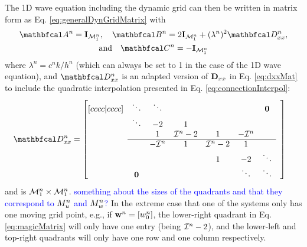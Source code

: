 \documentclass[fleqn]{jaes}
\def\SWcomment[#1]{\textcolor{blue}{#1}}
\begin{document}
The 1D wave equation including the dynamic grid can then be written in matrix form as Eq. \eqref{eq:generalDynGridMatrix} with
\begin{equation}\label{eq:1DwaveDynMatrix}
\begin{gathered}
    \AA = \I_{\MoneD}, \quad \BB = 2\I_\MoneD + (\lambda^n)^2\DDxx,\\
\text{and} \quad\CC = -\I_{\MoneD}
\end{gathered}
\end{equation}
where $\lambda^n = c^nk/h^n$ (which can always be set to 1 in the case of the 1D wave equation), and $\DDxx$ is an adapted version of $\mathbf{D}_{xx}$ in Eq. \eqref{eq:dxxMat} to include the quadratic interpolation presented in Eq. \eqref{eq:connectionInterpol}:
\begin{equation}\label{eq:magicMatrix}
    \!\!\!\!\!\!\DDxx = \begin{bmatrix}[cccc|cccc]
     & \ddots  &\ddots & & & & \boldsymbol{0} & \\
       & \ddots & -2 & 1 & & & & \\
      & & 1 & \Aterm -2 & 1 & -\Aterm & \\ \cline{2-7}
      & & -\Aterm & 1 & \Aterm -2 & 1 & & \\
         & & & &1 & -2 & \ddots  \\
         & \boldsymbol{0} & &  &  &\ddots & \ddots &
    \end{bmatrix}
\end{equation}
and is ${\mathcal{M}_1^n} \times {\mathcal{M}_1^n}$. \SWcomment[something about the sizes of the quadrants and that they correspond to $M_u^n$ and $M_w^n$?] In the extreme case that one of the systems only has one moving grid point, e.g., if $\mathbf{w}^n =[w_0^n]$, the lower-right quadrant in Eq. \eqref{eq:magicMatrix} will only have one entry (being $\mathcal{I}^n-2$), and the lower-left and top-right quadrants will only have one row and one column respectively. 
\end{document}
